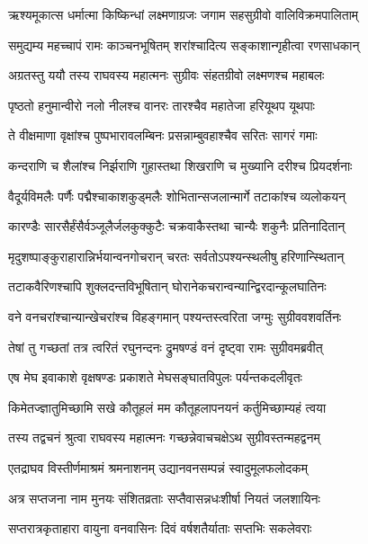 \twolineshloka
{ऋश्यमूकात्स धर्मात्मा किष्किन्धां लक्ष्मणाग्रजः}
{जगाम सहसुग्रीवो वालिविक्रमपालिताम्} %

\twolineshloka
{समुद्यम्य महच्चापं रामः काञ्चनभूषितम्}
{शरांश्चादित्य सङ्काशान्गृहीत्वा रणसाधकान्} %

\twolineshloka
{अग्रतस्तु ययौ तस्य राघवस्य महात्मनः}
{सुग्रीवः संहतग्रीवो लक्ष्मणश्च महाबलः} %

\twolineshloka
{पृष्ठतो हनुमान्वीरो नलो नीलश्च वानरः}
{तारश्चैव महातेजा हरियूथप यूथपाः} %

\twolineshloka
{ते वीक्षमाणा वृक्षांश्च पुष्पभारावलम्बिनः}
{प्रसन्नाम्बुवहाश्चैव सरितः सागरं गमाः} %

\twolineshloka
{कन्दराणि च शैलांश्च निर्झराणि गुहास्तथा}
{शिखराणि च मुख्यानि दरीश्च प्रियदर्शनाः} %

\twolineshloka
{वैदूर्यविमलैः पर्णैः पद्मैश्चाकाशकुड्मलैः}
{शोभितान्सजलान्मार्गे तटाकांश्च व्यलोकयन्} %

\twolineshloka
{कारण्डैः सारसैर्हंसैर्वञ्जूलैर्जलकुक्कुटैः}
{चक्रवाकैस्तथा चान्यैः शकुनैः प्रतिनादितान्} %

\twolineshloka
{मृदुशष्पाङ्कुराहारान्निर्भयान्वनगोचरान्}
{चरतः सर्वतोऽपश्यन्स्थलीषु हरिणान्स्थितान्} %

\twolineshloka
{तटाकवैरिणश्चापि शुक्लदन्तविभूषितान्}
{घोरानेकचरान्वन्यान्द्विरदान्कूलघातिनः} %

\twolineshloka
{वने वनचरांश्चान्यान्खेचरांश्च विहङ्गमान्}
{पश्यन्तस्त्वरिता जग्मुः सुग्रीववशवर्तिनः} %

\twolineshloka
{तेषां तु गच्छतां तत्र त्वरितं रघुनन्दनः}
{द्रुमषण्डं वनं दृष्ट्वा रामः सुग्रीवमब्रवीत्} %

\twolineshloka
{एष मेघ इवाकाशे वृक्षषण्डः प्रकाशते}
{मेघसङ्घातविपुलः पर्यन्तकदलीवृतः} %

\twolineshloka
{किमेतज्ज्ञातुमिच्छामि सखे कौतूहलं मम}
{कौतूहलापनयनं कर्तुमिच्छाम्यहं त्वया} %

\twolineshloka
{तस्य तद्वचनं श्रुत्वा राघवस्य महात्मनः}
{गच्छन्नेवाचचक्षेऽथ सुग्रीवस्तन्महद्वनम्} %

\twolineshloka
{एतद्राघव विस्तीर्णमाश्रमं श्रमनाशनम्}
{उद्यानवनसम्पन्नं स्वादुमूलफलोदकम्} %

\twolineshloka
{अत्र सप्तजना नाम मुनयः संशितव्रताः}
{सप्तैवासन्नधःशीर्षा नियतं जलशायिनः} %

\twolineshloka
{सप्तरात्रकृताहारा वायुना वनवासिनः}
{दिवं वर्षशतैर्याताः सप्तभिः सकलेवराः} %

